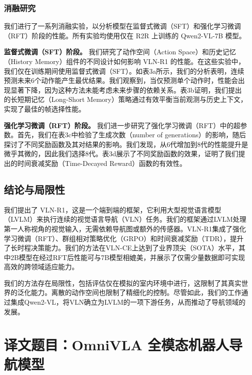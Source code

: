 \subsubsection{消融研究}

我们进行了一系列消融实验，以分析模型在监督式微调（SFT）和强化学习微调（RFT）阶段的性能。所有实验均使用仅在 R2R 上训练的 Qwen2-VL-7B 模型。

\textbf{监督式微调（SFT）阶段。} 我们研究了动作空间（Action Space）和历史记忆（History Memory）组件的不同设计如何影响 VLN-R1 的性能。在这些实验中，我们仅在训练期间使用监督式微调（SFT）。如表3a所示，我们的分析表明，连续预测未来6个动作能产生最优结果。我们观察到，当仅预测单个动作时，性能会出现显著下降，因为这种方法未能考虑未来步骤的依赖关系。表3b证明，我们提出的长短期记忆（Long-Short Memory）策略通过有效平衡当前观测与历史上下文，实现了最佳的帧选择性能。

\textbf{强化学习微调（RFT）阶段。} 我们进一步研究了强化学习微调（RFT）中的超参数。首先，我们在表3c中检验了生成次数（number of generations）的影响，随后探讨了不同奖励函数及其对结果的影响。我们发现，从6代增加到8代的性能提升是微乎其微的，因此我们选择8代。表3d展示了不同奖励函数的效果，证明了我们提出的时间衰减奖励（Time-Decayed Reward）函数的有效性。


\subsection{结论与局限性}

我们提出了 VLN-R1，这是一个端到端的框架，它利用大型视觉语言模型（LVLM）来执行连续的视觉语言导航（VLN）任务。我们的框架通过LVLM处理第一人称视角的视觉输入，无需依赖导航图或额外的传感器。VLN-R1集成了强化学习微调（RFT）、群组相对策略优化（GRPO）和时间衰减奖励（TDR），提升了长时程决策能力。我们的方法在VLN-CE上达到了业界顶尖（SOTA）水平，其中2B模型在经过RFT后性能可与7B模型相媲美，并展示了仅需少量数据即可实现高效的跨领域适应能力。

我们的方法存在局限性，包括评估仅在模拟的室内环境中进行，这限制了其真实世界的泛化能力。离散的动作空间也限制了精细化的控制。尽管如此，我们的工作通过集成Qwen2-VL，将VLN确立为LVLM的一项下游任务，从而推动了导航领域的发展。


\section*{译文题目：OmniVLA 全模态机器人导航模型}

